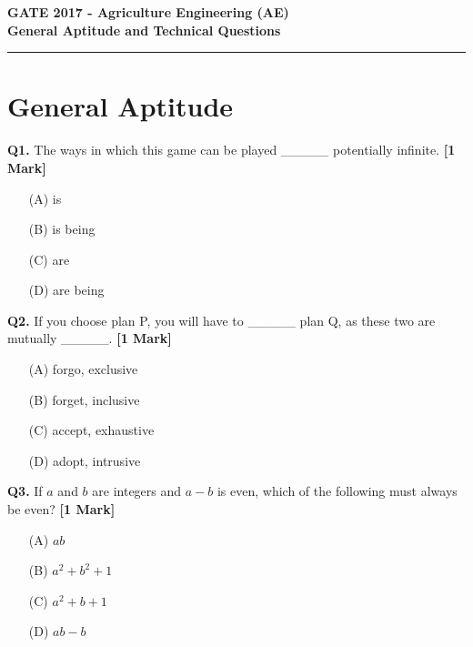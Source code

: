\documentclass[11pt]{article}
\newcommand{\questiona}[2]{
    \noindent\textbf{Q#2.} #1 \hfill \textbf{[1 Mark]}
}
\begin{document}
\begin{center}
    \Large\textbf{GATE 2017 - Agriculture Engineering (AE)} \\
    \large\textbf{General Aptitude and Technical Questions} \\
    \rule{\textwidth}{0.5pt} %
\end{center}

\vspace{0.5cm}

\section*{General Aptitude}

\questiona{The ways in which this game can be played \_\_\_\_\_ potentially infinite.}{1}
\begin{enumerate}
    \item[(A)] is
    \item[(B)] is being  
    \item[(C)] are
    \item[(D)] are being
\end{enumerate}

\vspace{0.5cm}

\questiona{If you choose plan P, you will have to \_\_\_\_\_ plan Q, as these two are mutually \_\_\_\_\_.}{2}
\begin{enumerate}
    \item[(A)] forgo, exclusive  
    \item[(B)] forget, inclusive  
    \item[(C)] accept, exhaustive  
    \item[(D)] adopt, intrusive
\end{enumerate}

\vspace{0.5cm}

\questiona{If $a$ and $b$ are integers and $a - b$ is even, which of the following must always be even?}{3}
\begin{enumerate}
    \item[(A)] $ab$
    \item[(B)] $a^2 + b^2 + 1$
    \item[(C)] $a^2 + b + 1$
    \item[(D)] $ab - b$
\end{enumerate}

\vspace{0.5cm}
\end{document}
